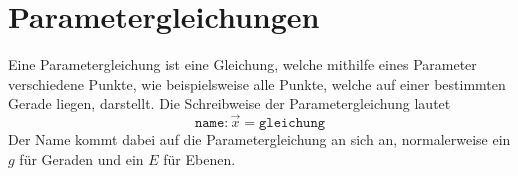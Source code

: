 \documentclass{article}
\begin{document}
 
\newcommand{\vect}[1]{\overrightarrow{#1}} 
 
\section{Parametergleichungen}
Eine Parametergleichung ist eine Gleichung, welche mithilfe eines Parameter verschiedene Punkte, wie beispielsweise alle Punkte, welche auf einer bestimmten Gerade liegen, darstellt. \newline
Die Schreibweise der Parametergleichung lautet 
\[
 \texttt{name}: \vect{x} = \texttt{gleichung}
\] 
Der Name kommt dabei auf die Parametergleichung an sich an, normalerweise ein $g$ für Geraden und ein $E$ für Ebenen. 
\end{document}
